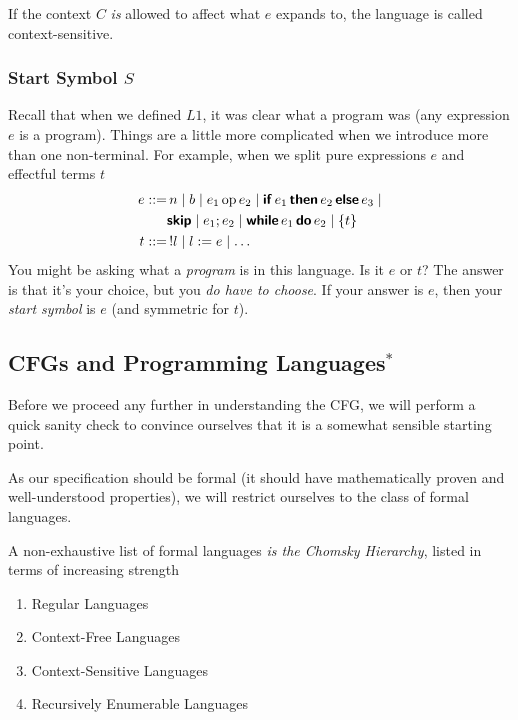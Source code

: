 If the context $C$ \textit{is} allowed to affect what $e$ expands to, the language is called context-sensitive. 

\subsubsection{Start Symbol $S$}
Recall that when we defined $L1$, it was clear what a program was (any expression $e$ is a program). Things are a little more complicated when we introduce more than one non-terminal. For example, when we split pure expressions $e$ and effectful terms $t$
\begin{align*}
    e ::=& \, n \mid b \mid e_1 \, \text{op} \, e_2 \mid \textbf{\textsf{if}} \, e_1 \, \textbf{\textsf{then}} \, e_2 \, \textbf{\textsf{else}} \, e_3 \mid \\
    & \textbf{\textsf{skip}} \mid e_1 ; e_2 \mid \textbf{\textsf{while}} \, e_1 \, \textbf{\textsf{do}} \, e_2 \mid \{ t \} \\
    t ::= & \, !l \mid l := e \mid \ldots
\end{align*}
You might be asking what a \textit{program} is in this language. Is it $e$ or $t$? The answer is that it's your choice, but you \textit{do have to choose}. If your answer is $e$, then your \textit{start symbol} is $e$ (and symmetric for $t$).

\subsection{CFGs and Programming Languages$^*$}\label{section:cfg-and-pl}
Before we proceed any further in understanding the CFG, we will perform a quick sanity check to convince ourselves that it is a somewhat sensible starting point. 

As our specification should be formal (it should have mathematically proven and well-understood properties), we will restrict ourselves to the class of formal languages. 

A non-exhaustive list of formal languages \textit{is the Chomsky Hierarchy}, listed in terms of increasing strength

\begin{enumerate}
    \item Regular Languages
    \item Context-Free Languages
    \item Context-Sensitive Languages
    \item Recursively Enumerable Languages
\end{enumerate}

